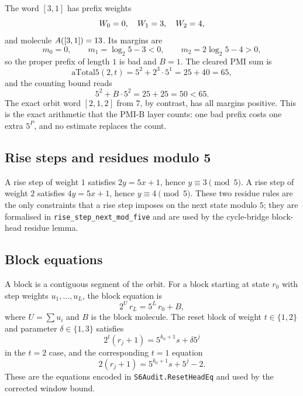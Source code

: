 The word $[3,1]$ has prefix weights
\begin{equation*}
  W_0=0,\quad W_1=3,\quad W_2=4,
\end{equation*}
and molecule $A([3,1])=13$.  Its margins are
\begin{equation*}
  m_0=0,\qquad
  m_1=\log_2 5-3<0,\qquad
  m_2=2\log_2 5-4>0,
\end{equation*}
so the proper prefix of length $1$ is bad and $B=1$.  The cleared PMI
sum is
\begin{equation*}
  \mathrm{aTotal5}(2,t)
    =5^2+2^3\cdot5^1=25+40=65,
\end{equation*}
and the counting bound reads
\begin{equation*}
  5^2+B\cdot5^2=25+25=50<65.
\end{equation*}
The exact orbit word $[2,1,2]$ from $7$, by contrast, has all margins
positive.  This is the exact arithmetic that the PMI-B layer counts:
one bad prefix costs one extra $5^P$, and no estimate replaces the
count.

\subsection{Rise steps and residues modulo 5}

A rise step of weight $1$ satisfies $2y=5x+1$, hence $y\equiv3
\pmod5$.  A rise step of weight $2$ satisfies $4y=5x+1$, hence
$y\equiv4\pmod5$.  These two residue rules are the only constraints
that a rise step imposes on the next state modulo $5$; they are
formalised in \texttt{rise\_step\_next\_mod\_five} and are used by the
cycle-bridge block-head residue lemma.

\subsection{Block equations}

A block is a contiguous segment of the orbit.  For a block starting at
state $r_0$ with step weights $u_1,\dots,u_L$, the block equation is
\begin{equation*}
  2^{U}\,r_L=5^L\,r_0+B,
\end{equation*}
where $U=\sum u_i$ and $B$ is the block molecule.  The reset block of
weight $t\in\{1,2\}$ and parameter $\delta\in\{1,3\}$ satisfies
\begin{equation*}
  2^t(r_j+1)=5^{k_0+1}s+\delta5^j
\end{equation*}
in the $t=2$ case, and the corresponding $t=1$ equation
\begin{equation*}
  2(r_j+1)=5^{k_0+1}s+5^j-2.
\end{equation*}
These are the equations encoded in
\texttt{S6Audit.ResetHeadEq} and used by the corrected window bound.

